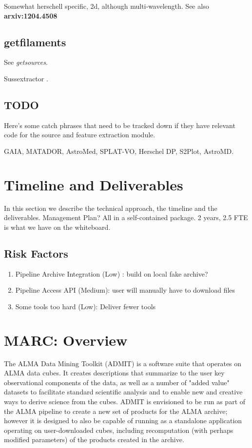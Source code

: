\documentclass[preprint]{aastex} %
\begin{document}
Somewhat herschell  specific, 2d, although multi-wavelength. See also
{\bf arxiv:1204.4508}

\subsection{getfilaments}

See {\it getsources}.

Sussextractor . 

\subsection{TODO}

Here's some catch phrases that need to be tracked down if they have
relevant code for the source and feature extraction module.

GAIA, MATADOR, AstroMed, SPLAT-VO, Herschel DP, S2Plot, AstroMD. 


\section{Timeline and Deliverables}

In this section we describe the technical approach, the
timeline and the deliverables. Management Plan? 
All in a self-contained package.
2 years, 2.5 FTE is what we have on the whiteboard.

\subsection{Risk Factors}

\begin{enumerate}
\item
Pipeline Archive Integration (Low) : build on local fake archive?
\item
Pipeline Access API (Medium): user will manually have to download files
\item
Some tools too hard (Low): Deliver fewer tools

\end{enumerate}

\section { MARC: Overview }
The ALMA Data Mining Toolkit (ADMIT) is a software suite that operates on
ALMA data cubes. It creates descriptions that summarize to the user key
observational components of the data, as well as a number of "added value"
datasets to facilitate standard scientific analysis and to enable new and
creative ways to derive science from the cubes.  ADMIT is envisioned to
be run as part of the ALMA pipeline to create a new set of products for
the ALMA archive; however it is designed to also be capable of running
as a standalone application operating on user-downloaded cubes, including
recomputation (with perhaps modified parameters) of the products created
in the archive.
\end{document}
